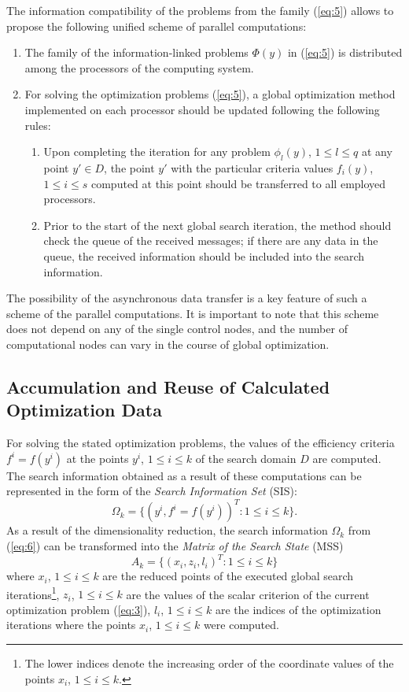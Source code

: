 \documentclass[runningheads]{llncs}
\begin{document}
The information compatibility of the problems from the family (\ref{eq:5}) allows to propose the following unified scheme of parallel computations:
\begin{enumerate}
	\item The family of the information-linked problems $\Phi(y)$ in (\ref{eq:5}) is distributed among the processors of the computing system. 
  \item For solving the optimization problems (\ref{eq:5}), a global optimization method implemented on each processor should be updated following the following rules:
  \begin{enumerate}
		\item Upon completing the iteration for any problem $\phi_l(y)$, $1 \leq l \leq q$ at any point $y' \in D$, the point $y'$ with the particular criteria values $f_i(y)$, $1 \leq i \leq s$ computed at this point should be transferred to all employed processors.
	  \item Prior to the start of the next global search iteration, the method should check the queue of the received messages; if there are any data in the queue, the received information should be included into the search information.
	\end{enumerate}
\end{enumerate}
	
The possibility of the asynchronous data transfer is a key feature of such a scheme of the parallel computations. It is important to note that this scheme does not depend on any of the single control nodes, and the number of computational nodes can vary in the course of global optimization.


\subsection{Accumulation and Reuse of Calculated Optimization Data}
\label{ssec:32}

For solving the stated optimization problems, the values of the efficiency criteria $f^i=f(y^i)$ at the points $y^i$, $1 \leq i \leq k$ of the search domain $D$ are computed. The search information obtained as a result of these computations can be represented in the form of the \textit{Search Information Set} (SIS):
\begin{equation}\label{eq:6}
\Omega_k=\{(y^i,f^i=f(y^i ) )^T:1 \leq i \leq k\}.
\end{equation}
As a result of the dimensionality reduction, the search information $\Omega_k$ from (\ref{eq:6}) can be transformed into the \textit{Matrix of the Search State} (MSS) 
\begin{equation}\label{eq:7}
A_k=\{(x_i,z_i,l_i )^T:1 \leq i \leq k\}
\end{equation}
where $x_i$, $1 \leq i \leq k$ are the reduced points of the executed global search  iterations\footnote{The lower indices denote the increasing order of the coordinate values of the points $x_i$, $1 \leq i \leq k$.}, $z_i$, $1 \leq i \leq k$ are the values of the scalar criterion of the current optimization problem (\ref{eq:3}), $l_i$, $1 \leq i \leq k$ are the indices of the optimization iterations where the points $x_i$, $1 \leq i \leq k$ were computed.
\end{document}
